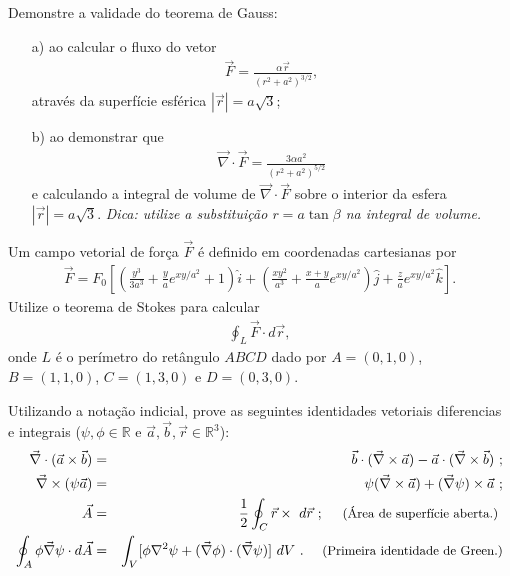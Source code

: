 \documentclass[a4paper,12pt]{article}
\begin{document}
\newpage
{}

\indent \par Demonstre a validade do teorema de Gauss:
%
\begin{itemize}
 \item[a)] ao calcular o fluxo do vetor
%
\begin{eqnarray}
\nonumber
\vec{F}= \frac{\alpha \vec{r}}{(r^2 + a^2)^{3/2}},
\end{eqnarray}
\noindent através da superfície esférica $|\vec{r}|=a\sqrt{3}$;
%
\item[b)] ao demonstrar que 
%
\begin{eqnarray}
\nonumber
\vec{\nabla} \cdot \vec{F} = \frac{3\alpha a^2}{(r^2 + a^2)^{5/2}}
\end{eqnarray}
\noindent e calculando a integral de volume de $\vec{\nabla} \cdot \vec{F}$ sobre o interior da esfera $|\vec{r}|=a\sqrt{3}$. {\it{Dica: utilize a substituição $r=a \tan \beta$ na integral de volume.}}\\
%
%
\end{itemize}
%
{}

\indent \par Um campo vetorial de força $\vec{F}$ é definido em coordenadas cartesianas por
%
\begin{eqnarray}
\nonumber
\vec{F}= F_{0}\left[ \left( \frac{y^3}{3 a^3} + \frac{y}{a} e^{xy/ a^2} + 1 \right)\hat{i} + \left( \frac{x y^2}{a^3} + \frac{x+y}{a} e^{xy/ a^2}  \right)\hat{j} + \frac{z}{a}e^{xy/ a^2} \hat{k} \right].
\end{eqnarray}
%
\noindent Utilize o teorema de Stokes para calcular 
%
\begin{eqnarray}
\nonumber
\oint_{L} \vec{F}\cdot d\vec{r},
\end{eqnarray}
%
\noindent onde $L$ é o perímetro do retângulo $ABCD$ dado por $A=(0,1,0)$, $B=(1,1,0)$, $C=(1,3,0)$ e $D=(0,3,0)$.\\
%

\indent \par Utilizando a notação indicial, prove as seguintes identidades vetoriais diferencias e integrais ($\psi , \phi \in \mathbb{R}$ e $\vec{a} , \vec{b}, \vec{r} \in \mathbb{R}^{3}$):
%
\begin{eqnarray}
\nonumber
\vec{\nabla} \cdot (\vec{a} \times \vec{b}) &=& \vec{b} \cdot (\vec{\nabla} \times \vec{a}) - \vec{a} \cdot (\vec{\nabla} \times \vec{b}) ~;\\
\nonumber
\vec{\nabla} \times (\psi\vec{a}) &=& \psi (\vec{\nabla}\times \vec{a}) + (\vec{\nabla}\psi) \times \vec{a} ~;\\
\nonumber
\vec{A} &=& \frac{1}{2} \oint_{C} \vec{r}\times ~d\vec{r} ~; ~~~~{\small{\textnormal{(Área de superfície aberta.)}}} ~\\
\nonumber
\oint_{A} \phi \vec{\nabla}\psi \cdot d\vec{A}&=&\int_{V} [\phi \nabla^{2}\psi + (\vec{\nabla} \phi)\cdot (\vec{\nabla} \psi)] ~dV ~. ~~~~ {\small{ \textnormal{(Primeira identidade de Green.)} }}\\
\end{eqnarray}
%
%
%
\end{document}
